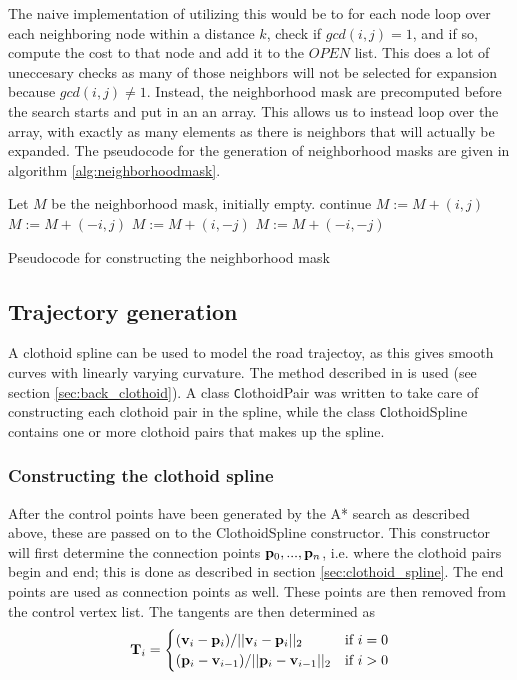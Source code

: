 The naive implementation of utilizing this would be to for each node loop over each neighboring node within a distance $k$, check if $gcd(i,j)=1$, and if so, compute the cost to that node and add it to the $OPEN$ list. This does a lot of uneccesary checks as many of those neighbors will not be selected for expansion because $gcd(i,j)\neq 1$. Instead, the neighborhood mask are precomputed before the search starts and put in an an array. This allows us to instead loop over the array, with exactly as many elements as there is neighbors that will actually be expanded. The pseudocode for the generation of neighborhood masks are given in algorithm \ref{alg:neighborhoodmask}.

\begin{algorithm}
\begin{algorithmic}
\STATE Let $M$ be the neighborhood mask, initially empty.
            \STATE continue
        \ENDIF
        \STATE $M := M + (i,j)$
            \STATE $M := M + (-i,j)$
            \STATE $M := M + (i,-j)$
            \STATE $M := M + (-i,-j)$
        \ENDIF
    \ENDFOR
\ENDFOR
\end{algorithmic}
\caption{Pseudocode for constructing the neighborhood mask}
\label{alg:neighborhoodmask}
\end{algorithm}

\subsection{Trajectory generation} 
A clothoid spline can be used to model the road trajectoy, as this gives smooth curves with linearly varying curvature. The method described in \cite{clothoid} is used (see section \ref{sec:back_clothoid}). A class {\texttt ClothoidPair} was written to take care of constructing each clothoid pair in the spline, while the class {\texttt ClothoidSpline} contains one or more clothoid pairs that makes up the spline.

\subsubsection{Constructing the clothoid spline}
After the control points have been generated by the A* search as described above, these are passed on to the ClothoidSpline constructor. This constructor will first determine the connection points ${\mathbf p}_0, ..., {\mathbf p}_n$, i.e. where the clothoid pairs begin and end; this is done as described in section \ref{sec:clothoid_spline}. The end points are used as connection points as well. These points are then removed from the control vertex list. The tangents are then determined as 
\begin{equation}
{\mathbf T}_i = 
\begin{cases}
({\mathbf v}_i - {\mathbf p}_i)/||{\mathbf v}_i - {\mathbf p}_i||_2 & \mbox{if $i = 0$}\\
({\mathbf p}_i - {\mathbf v}_{i-1})/||{\mathbf p}_i - {\mathbf v}_{i-1}||_2 & \mbox{if $i > 0$}
\end{cases}
\label{eq:connector_tangents}
\end{equation}

